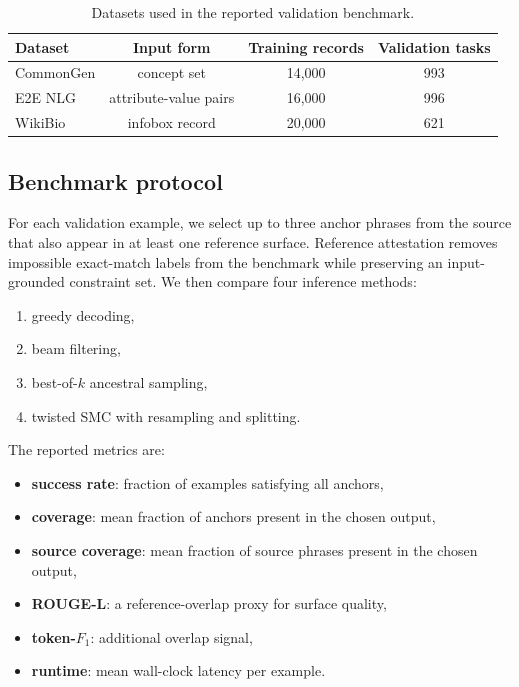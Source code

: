 \documentclass[11pt]{article}
\begin{document}
\begin{table}[H]
\centering
\caption{Datasets used in the reported validation benchmark.}
\label{tab:datasets}
\begin{tabular}{lccc}
\toprule
Dataset & Input form & Training records & Validation tasks \\
\midrule
CommonGen & concept set & 14{,}000 & 993 \\
E2E NLG & attribute-value pairs & 16{,}000 & 996 \\
WikiBio & infobox record & 20{,}000 & 621 \\
\bottomrule
\end{tabular}
\end{table}
\FloatBarrier

\subsection{Benchmark protocol}
For each validation example, we select up to three anchor phrases from the source that also appear in at least one reference surface. Reference attestation removes impossible exact-match labels from the benchmark while preserving an input-grounded constraint set. We then compare four inference methods:
\begin{enumerate}[leftmargin=1.5em]
  \item greedy decoding,
  \item beam filtering,
  \item best-of-$k$ ancestral sampling,
  \item twisted SMC with resampling and splitting.
\end{enumerate}

The reported metrics are:
\begin{itemize}[leftmargin=1.5em]
  \item \textbf{success rate}: fraction of examples satisfying all anchors,
  \item \textbf{coverage}: mean fraction of anchors present in the chosen output,
  \item \textbf{source coverage}: mean fraction of source phrases present in the chosen output,
  \item \textbf{ROUGE-L}: a reference-overlap proxy for surface quality,
  \item \textbf{token-$F_1$}: additional overlap signal,
  \item \textbf{runtime}: mean wall-clock latency per example.
\end{itemize}
\end{document}
